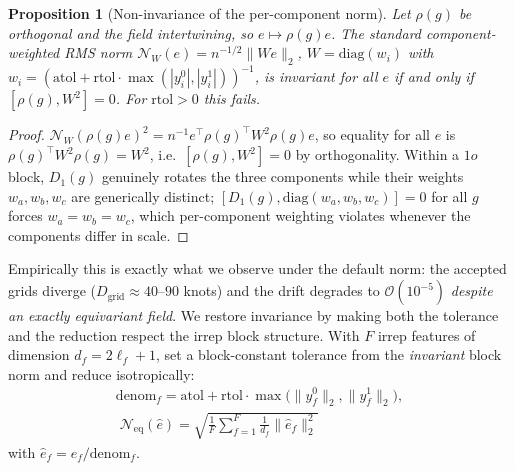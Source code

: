 \documentclass[10pt,journal]{IEEEtran}
\newtheorem{proposition}{Proposition}
\begin{document}
\begin{proposition}[Non-invariance of the per-component norm]
\label{prop:fail}
Let $\rho(g)$ be orthogonal and the field intertwining, so $e\mapsto\rho(g)e$. The standard
component-weighted RMS norm $\mathcal{N}_W(e)=n^{-1/2}\|We\|_2$, $W=\mathrm{diag}(w_i)$ with
$w_i=(\mathrm{atol}+\mathrm{rtol}\cdot\max(|y^0_i|,|y^1_i|))^{-1}$, is invariant for all $e$ if and
only if $[\rho(g),W^2]=0$. For $\mathrm{rtol}>0$ this fails.
\end{proposition}
\begin{proof}
$\mathcal{N}_W(\rho(g)e)^2=n^{-1}e^{\!\top}\rho(g)^{\!\top}W^2\rho(g)e$, so equality for all $e$ is
$\rho(g)^{\!\top}W^2\rho(g)=W^2$, i.e.\ $[\rho(g),W^2]=0$ by orthogonality. Within a $1o$ block,
$D_1(g)$ genuinely rotates the three components while their weights $w_a,w_b,w_c$ are generically
distinct; $[D_1(g),\mathrm{diag}(w_a,w_b,w_c)]=0$ for all $g$ forces $w_a=w_b=w_c$, which
per-component weighting violates whenever the components differ in scale.
\end{proof}
%
Empirically this is exactly what we observe under the default norm: the accepted grids diverge
($D_{\text{grid}}\approx40\text{--}90$ knots) and the drift degrades to $\mathcal{O}(10^{-5})$
\emph{despite an exactly equivariant field}. We restore invariance by making both the tolerance and
the reduction respect the irrep block structure. With $F$ irrep features of dimension
$d_f=2\ell_f+1$, set a block-constant tolerance from the \emph{invariant} block norm and reduce
isotropically:
%
\begin{equation}
\label{eq:neq}
\begin{gathered}
\mathrm{denom}_f=\mathrm{atol}+\mathrm{rtol}\cdot\max\big(\|y^0_f\|_2,\|y^1_f\|_2\big),\\[2pt]
\boxed{\;\mathcal{N}_{\text{eq}}(\hat e)=\sqrt{\frac1F\sum_{f=1}^{F}\frac{1}{d_f}\|\hat e_f\|_2^2}\;}
\end{gathered}
\end{equation}
%
with $\hat e_f=e_f/\mathrm{denom}_f$.
\end{document}
